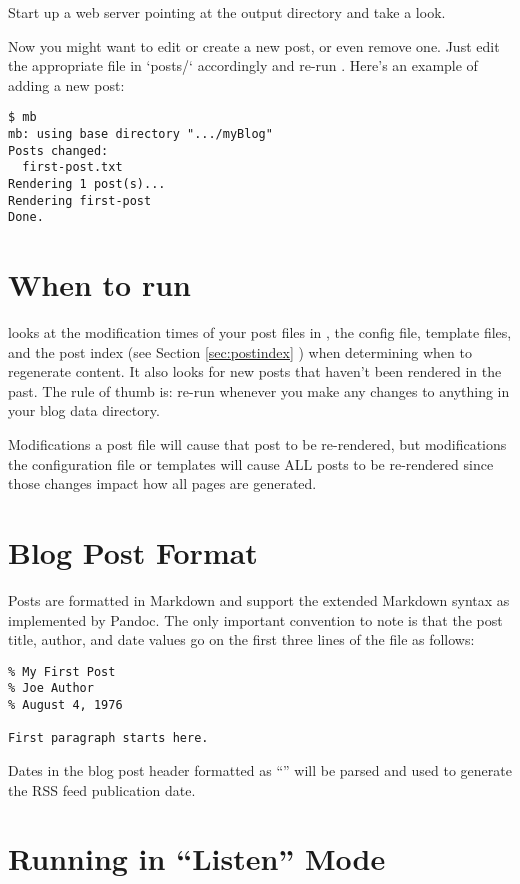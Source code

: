 \documentclass[11pt, letterpaper, oneside, titlepage]{book}
\begin{document}
Start up a web server pointing at the output directory and take a
look.

Now you might want to edit or create a new post, or even remove one.
Just edit the appropriate file in `posts/` accordingly and re-run
.  Here's an example of adding a new post:

\begin{verbatim}
$ mb
mb: using base directory ".../myBlog"
Posts changed:
  first-post.txt
Rendering 1 post(s)...
Rendering first-post
Done.
\end{verbatim}

\section{When to run }

 looks at the modification times of your post files in
, the config file, template files, and the post index (see
Section \ref{sec:postindex} ) when determining when to regenerate
content.  It also looks for new posts that haven't been rendered in
the past.  The rule of thumb is: re-run  whenever you make any
changes to anything in your blog data directory.

Modifications a post file will cause that post to be re-rendered, but
modifications the configuration file or templates will cause ALL posts
to be re-rendered since those changes impact how all pages are
generated.

\section{Blog Post Format}

Posts are formatted in Markdown and support the extended Markdown
syntax as implemented by Pandoc.  The only important convention to
note is that the post title, author, and date values go on the first
three lines of the file as follows:

\begin{verbatim}
% My First Post
% Joe Author
% August 4, 1976

First paragraph starts here.
\end{verbatim}

Dates in the blog post header formatted as ``'' will be parsed and used to generate the RSS feed
publication date.

\section{Running  in ``Listen'' Mode}
\end{document}
